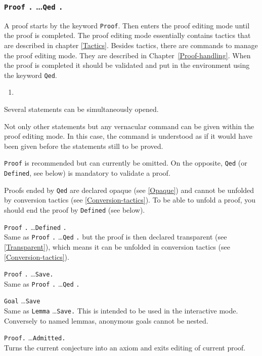 \subsubsection{{\tt Proof} {\tt .} \dots {\tt Qed} {\tt .}
}

A proof starts by the keyword {\tt Proof}.  Then {\Coq} enters the
proof editing mode until the proof is completed. The proof editing
mode essentially contains tactics that are described in chapter
\ref{Tactics}. Besides tactics, there are commands to manage the proof
editing mode. They are described in Chapter~\ref{Proof-handling}. When
the proof is completed it should be validated and put in the
environment using the keyword {\tt Qed}.
\medskip

\ErrMsg
\begin{enumerate}
\item {}
\end{enumerate}

\begin{Remarks}
\item Several statements can be simultaneously opened.
\item Not only other statements but any vernacular command can be given
within the proof editing mode. In this case, the command is
understood as if it would have been given before the statements still to be
proved. 
\item {\tt Proof} is recommended but can currently be omitted. On the
opposite, {\tt Qed} (or {\tt Defined}, see below) is mandatory to validate a proof.
\item Proofs ended by {\tt Qed} are declared opaque (see \ref{Opaque})
and cannot be unfolded by conversion tactics (see \ref{Conversion-tactics}).
To be able to unfold a proof, you should end the proof by {\tt Defined}
 (see below). 
\end{Remarks}

\begin{Variants}
\item {\tt Proof} {\tt .} \dots {\tt Defined} {\tt .}\\
  Same as {\tt Proof} {\tt .} \dots {\tt Qed} {\tt .} but the proof is
  then declared transparent (see \ref{Transparent}), which means it
  can be unfolded in conversion tactics (see \ref{Conversion-tactics}).
\item {\tt Proof} {\tt .} \dots {\tt Save.}\\
  Same as {\tt Proof} {\tt .} \dots {\tt Qed} {\tt .}
\item {\tt Goal} \type \dots {\tt Save} \ident \\
  Same as {\tt Lemma} \ident {\tt :} \type \dots {\tt Save.}
  This is intended to be used in the interactive mode. Conversely to named
  lemmas, anonymous goals cannot be nested.
\item {\tt Proof.} \dots {\tt Admitted.}\\
  Turns the current conjecture into an axiom and exits editing of
  current proof.
\end{Variants}


